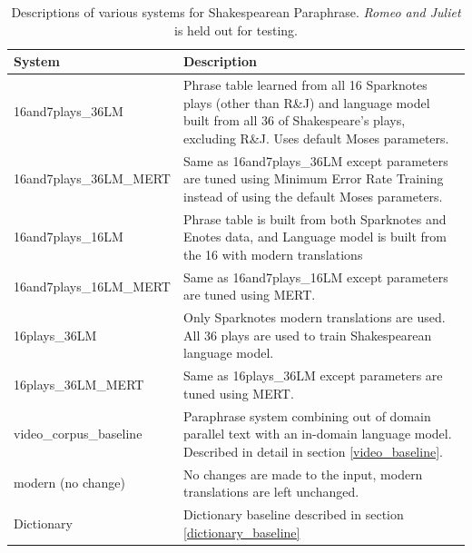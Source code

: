 \documentclass[10pt,a5paper,twoside]{article}
\begin{document}
\begin{table}
  \begin{center}
    \begin{tabular}{|l|p{3in}|}
      \hline
      System & Description \\
      \hline
      \hline
      16and7plays\_36LM & Phrase table learned from all 16 Sparknotes plays (other than R\&J) and language model built from all 36 of Shakespeare's plays, excluding R\&J.
      Uses default Moses parameters. \\
      \hline
      16and7plays\_36LM\_MERT & Same as 16and7plays\_36LM except parameters are tuned using Minimum Error Rate Training \cite{MERT} instead of using the default Moses parameters.\\
      \hline
      16and7plays\_16LM & Phrase table is built from both Sparknotes and Enotes data, and Language model is built from the 16 with modern translations\\
      \hline
      16and7plays\_16LM\_MERT & Same as 16and7plays\_16LM except parameters are tuned using MERT. \\
      \hline
      16plays\_36LM & Only Sparknotes modern translations are used.  All 36 plays are used to train Shakespearean language model.\\
      \hline
      16plays\_36LM\_MERT & Same as 16plays\_36LM except parameters are tuned using MERT. \\
      \hline
      video\_corpus\_baseline & Paraphrase system combining out of domain parallel text \cite{chen11} with an in-domain language model.  Described
      in detail in section \ref{video_baseline}. \\
      \hline
      modern (no change) & No changes are made to the input, modern translations are left unchanged. \\
      \hline
      Dictionary & Dictionary baseline described in section \ref{dictionary_baseline}\\
      \hline
    \end{tabular}
  \end{center}
  \caption{Descriptions of various systems for Shakespearean Paraphrase.  {\em Romeo and Juliet} is held out for testing.}
  \label{systems}
\end{table}
\end{document}
